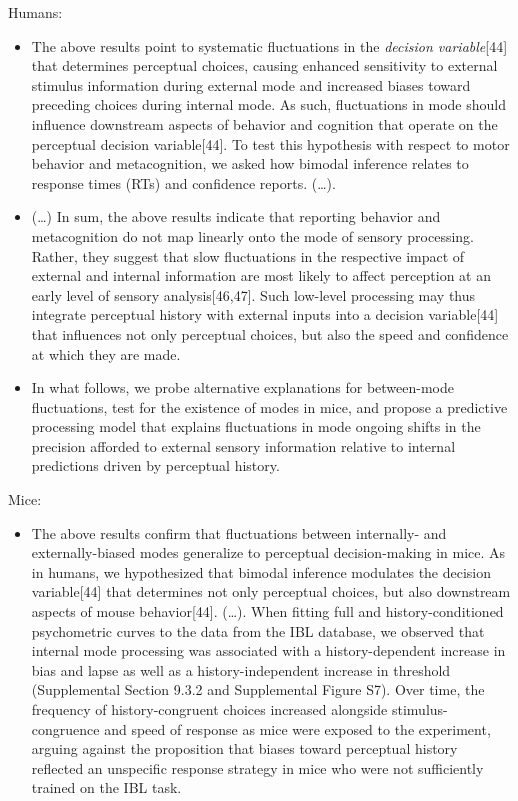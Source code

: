 \documentclass[
]{article}
\providecommand{\tightlist}{%
  \setlength{\itemsep}{0pt}\setlength{\parskip}{0pt}}
\begin{document}
Humans:

\begin{itemize}
\item
  The above results point to systematic fluctuations in the
  \emph{decision variable}{[}44{]} that determines perceptual choices,
  causing enhanced sensitivity to external stimulus information during
  external mode and increased biases toward preceding choices during
  internal mode. As such, fluctuations in mode should influence
  downstream aspects of behavior and cognition that operate on the
  perceptual decision variable{[}44{]}. To test this hypothesis with
  respect to motor behavior and metacognition, we asked how bimodal
  inference relates to response times (RTs) and confidence reports.
  (\ldots).
\item
  (\ldots) In sum, the above results indicate that reporting behavior
  and metacognition do not map linearly onto the mode of sensory
  processing. Rather, they suggest that slow fluctuations in the
  respective impact of external and internal information are most likely
  to affect perception at an early level of sensory analysis{[}46,47{]}.
  Such low-level processing may thus integrate perceptual history with
  external inputs into a decision variable{[}44{]} that influences not
  only perceptual choices, but also the speed and confidence at which
  they are made.
\item
  In what follows, we probe alternative explanations for between-mode
  fluctuations, test for the existence of modes in mice, and propose a
  predictive processing model that explains fluctuations in mode ongoing
  shifts in the precision afforded to external sensory information
  relative to internal predictions driven by perceptual history.
\end{itemize}

Mice:

\begin{itemize}
\tightlist
\item
  The above results confirm that fluctuations between internally- and
  externally-biased modes generalize to perceptual decision-making in
  mice. As in humans, we hypothesized that bimodal inference modulates
  the decision variable{[}44{]} that determines not only perceptual
  choices, but also downstream aspects of mouse behavior{[}44{]}.
  (\ldots). When fitting full and history-conditioned psychometric
  curves to the data from the IBL database, we observed that internal
  mode processing was associated with a history-dependent increase in
  bias and lapse as well as a history-independent increase in threshold
  (Supplemental Section 9.3.2 and Supplemental Figure S7). Over time,
  the frequency of history-congruent choices increased alongside
  stimulus-congruence and speed of response as mice were exposed to the
  experiment, arguing against the proposition that biases toward
  perceptual history reflected an unspecific response strategy in mice
  who were not sufficiently trained on the IBL task.
\end{itemize}
\end{document}
